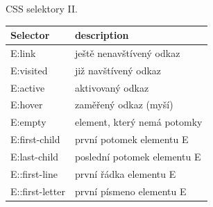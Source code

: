 \documentclass{beamer}
\begin{document}
\begin{frame}{CSS selektory II.}


\begin{tabular}{|l|l|}
\hline
\textbf{Selector} 		& \textbf{description} \\  \hline
	E:link 				& ještě nenavštívený odkaz\\  \hline
	E:visited 			& již navštívený odkaz\\  \hline
	E:active 			& aktivovaný odkaz\\  \hline
	E:hover			 	& zaměřený odkaz (myší)\\  \hline
	E:empty 			& element, který nemá potomky\\  \hline
	E:first-child  		& první potomek elementu E\\  \hline
	E:last-child  		& poslední potomek elementu E\\  \hline
	E::first-line 		& první řádka elementu E\\  \hline
	E::first-letter 	& první písmeno elementu E\\  \hline

\end{tabular}


\end{frame}
\end{document}
